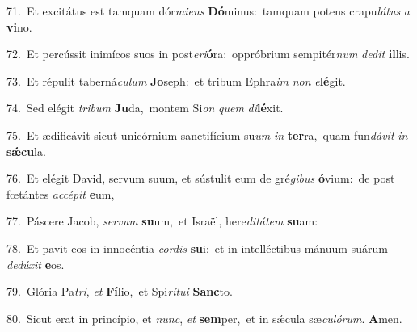 {\numbfont\textcolor{\numbcolor}{71.}}~Et excitátus est tamquam dór\-\textit{mi}\-\textit{ens} \textbf{Dó}\-minus:~\star tamquam potens crapu\-\textit{lá}\-\textit{tus} \textit{a} \textbf{vi}\-no.\par
{\numbfont\textcolor{\numbcolor}{72.}}~Et percússit inimícos suos in post\-\textit{e}\-\textit{ri}\textbf{ó}ra:~\star oppróbrium sempitér\textit{num} \textit{de}\-\textit{dit} \textbf{il}\-lis.\par
{\numbfont\textcolor{\numbcolor}{73.}}~Et répulit taberná\-\textit{cu}\-\textit{lum} \textbf{Jo}\-seph:~\star et tribum Ephra\textit{im} \textit{non} \textit{e}\-\textbf{lé}git.\par
{\numbfont\textcolor{\numbcolor}{74.}}~Sed elégit \textit{tri}\-\textit{bum} \textbf{Ju}\-da,~\star montem Si\textit{on} \textit{quem} \textit{di}\-\textbf{lé}xit.\par
{\numbfont\textcolor{\numbcolor}{75.}}~Et ædificávit sicut unicórnium sanctifícium su\textit{um} \textit{in} \textbf{ter}\-ra,~\star quam fun\-\textit{dá}\-\textit{vit} \textit{in} \textbf{sǽ}\-\textbf{cu}la.\par
{\numbfont\textcolor{\numbcolor}{76.}}~Et elégit David, servum suum, et sústulit eum de gré\-\textit{gi}\-\textit{bus} \textbf{ó}\-vium:~\star de post fœtántes \textit{ac}\-\textit{cé}\textit{pit} \textbf{e}\-um,\par
{\numbfont\textcolor{\numbcolor}{77.}}~Páscere Jacob, \textit{ser}\-\textit{vum} \textbf{su}\-um,~\star et Israël, here\-\textit{di}\-\textit{tá}\textit{tem} \textbf{su}\-am:\par
{\numbfont\textcolor{\numbcolor}{78.}}~Et pavit eos in innocéntia \textit{cor}\-\textit{dis} \textbf{su}\-i:~\star et in intelléctibus mánuum suárum \textit{de}\-\textit{dú}\textit{xit} \textbf{e}\-os.\par
{\numbfont\textcolor{\numbcolor}{79.}}~Glória Pa\-\textit{tri}\-, \textit{et} \textbf{Fí}\-lio,~\star et Spi\-\textit{rí}\-\textit{tu}\textit{i} \textbf{Sanc}\-to.\par
{\numbfont\textcolor{\numbcolor}{80.}}~Sicut erat in princípio, et \textit{nunc}\-, \textit{et} \textbf{sem}\-per,~\star et in sǽcula sæ\-\textit{cu}\-\textit{ló}\textit{rum}. \textbf{A}\-men.\par
